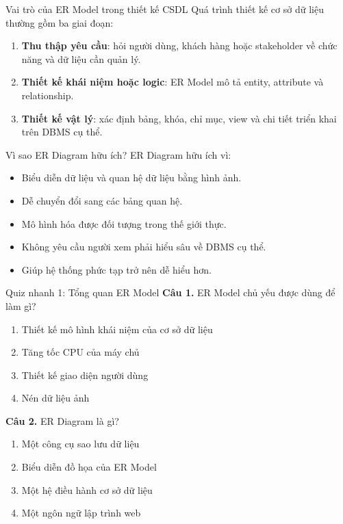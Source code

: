 \documentclass[aspectratio=169,11pt]{beamer}
\newcommand{\keyword}[1]{\textcolor{accent}{\textbf{#1}}}
\newcommand{\kw}[1]{\keyword{#1}}
\newcommand{\tightlist}{\setlength{\itemsep}{2pt}\setlength{\parskip}{0pt}}
\newcommand{\smallitem}{\setlength{\itemsep}{2pt}\setlength{\parskip}{0pt}}
\newcommand{\qoption}[2]{\item[#1.] #2}
\begin{document}
\begin{frame}{Vai trò của ER Model trong thiết kế CSDL}
\small
Quá trình thiết kế cơ sở dữ liệu thường gồm ba giai đoạn:
\begin{enumerate}
\smallitem
  \item \kw{Thu thập yêu cầu}: hỏi người dùng, khách hàng hoặc stakeholder về chức năng và dữ liệu cần quản lý.
  \item \kw{Thiết kế khái niệm hoặc logic}: ER Model mô tả entity, attribute và relationship.
  \item \kw{Thiết kế vật lý}: xác định bảng, khóa, chỉ mục, view và chi tiết triển khai trên DBMS cụ thể.
\end{enumerate}
\end{frame}

\begin{frame}{Vì sao ER Diagram hữu ích?}
\small
ER Diagram hữu ích vì:
\begin{itemize}
\smallitem
  \item Biểu diễn dữ liệu và quan hệ dữ liệu bằng hình ảnh.
  \item Dễ chuyển đổi sang các bảng quan hệ.
  \item Mô hình hóa được đối tượng trong thế giới thực.
  \item Không yêu cầu người xem phải hiểu sâu về DBMS cụ thể.
  \item Giúp hệ thống phức tạp trở nên dễ hiểu hơn.
\end{itemize}
\end{frame}

\begin{frame}{Quiz nhanh 1: Tổng quan ER Model}
\small
\textbf{Câu 1.} ER Model chủ yếu được dùng để làm gì?
\begin{enumerate}
\tightlist
  \qoption{A}{Thiết kế mô hình khái niệm của cơ sở dữ liệu}
  \qoption{B}{Tăng tốc CPU của máy chủ}
  \qoption{C}{Thiết kế giao diện người dùng}
  \qoption{D}{Nén dữ liệu ảnh}
\end{enumerate}

\textbf{Câu 2.} ER Diagram là gì?
\begin{enumerate}
\tightlist
  \qoption{A}{Một công cụ sao lưu dữ liệu}
  \qoption{B}{Biểu diễn đồ họa của ER Model}
  \qoption{C}{Một hệ điều hành cơ sở dữ liệu}
  \qoption{D}{Một ngôn ngữ lập trình web}
\end{enumerate}
\end{frame}
\end{document}
